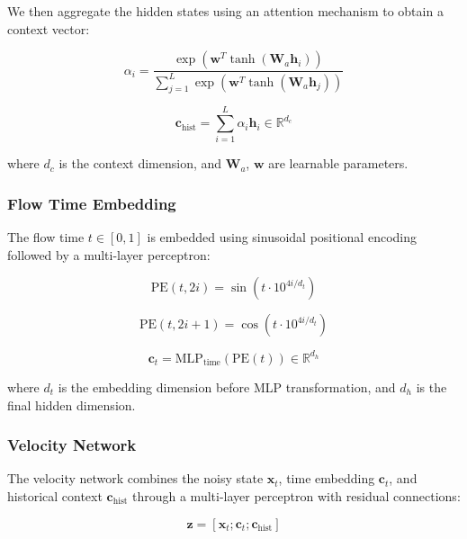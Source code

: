 \documentclass[11pt,a4paper]{article}
\begin{document}
We then aggregate the hidden states using an attention mechanism to obtain a context vector:

\begin{equation}
    \alpha_i = \frac{\exp(\mathbf{w}^T \tanh(\mathbf{W}_a \mathbf{h}_i))}{\sum_{j=1}^L \exp(\mathbf{w}^T \tanh(\mathbf{W}_a \mathbf{h}_j))}
\end{equation}

\begin{equation}
    \mathbf{c}_{\text{hist}} = \sum_{i=1}^L \alpha_i \mathbf{h}_i \in \mathbb{R}^{d_c}
\end{equation}

where $d_c$ is the context dimension, and $\mathbf{W}_a$, $\mathbf{w}$ are learnable parameters.

\subsubsection{Flow Time Embedding}

The flow time $t \in [0,1]$ is embedded using sinusoidal positional encoding followed by a multi-layer perceptron:

\begin{equation}
    \text{PE}(t, 2i) = \sin(t \cdot 10^{4i/d_t})
\end{equation}

\begin{equation}
    \text{PE}(t, 2i+1) = \cos(t \cdot 10^{4i/d_t})
\end{equation}

\begin{equation}
    \mathbf{c}_t = \text{MLP}_{\text{time}}(\text{PE}(t)) \in \mathbb{R}^{d_h}
\end{equation}

where $d_t$ is the embedding dimension before MLP transformation, and $d_h$ is the final hidden dimension.

\subsubsection{Velocity Network}

The velocity network combines the noisy state $\mathbf{x}_t$, time embedding $\mathbf{c}_t$, and historical context $\mathbf{c}_{\text{hist}}$ through a multi-layer perceptron with residual connections:

\begin{equation}
    \mathbf{z} = [\mathbf{x}_t; \mathbf{c}_t; \mathbf{c}_{\text{hist}}]
\end{equation}
\end{document}
